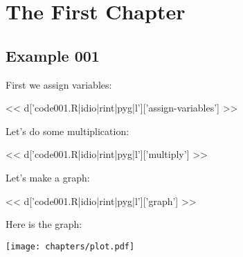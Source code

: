 \chapter{The First Chapter}

\section{Example 001}
First we assign variables:

<< d['code001.R|idio|rint|pyg|l']['assign-variables'] >>

Let's do some multiplication:

<< d['code001.R|idio|rint|pyg|l']['multiply'] >>

Let's make a graph:

<< d['code001.R|idio|rint|pyg|l']['graph'] >>

Here is the graph:

\texttt{[image: chapters/plot.pdf]}

